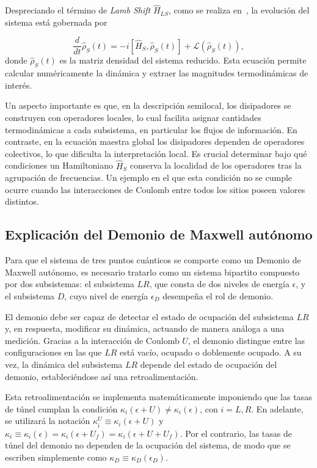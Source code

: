 Despreciando el término de \textit{Lamb Shift} $\hat{H}_{LS}$, como se realiza en~\cite{prech2023entanglement}, la evolución del sistema está gobernada por  

\begin{equation}
    \frac{d}{dt}\hat{\rho}_{S}(t) = -i[\hat{H}_{S},\hat{\rho}_{S}(t)] + \mathcal{L}(\hat{\rho}_{S}(t)),
\end{equation}
donde $\hat{\rho}_{S}(t)$ es la matriz densidad del sistema reducido. Esta ecuación permite calcular numéricamente la dinámica y extraer las magnitudes termodinámicas de interés.  

Un aspecto importante es que, en la descripción semilocal, los disipadores se construyen con operadores locales, lo cual facilita asignar cantidades termodinámicas a cada subsistema, en particular los flujos de información. En contraste, en la ecuación maestra global los disipadores dependen de operadores colectivos, lo que dificulta la interpretación local. Es crucial determinar bajo qué condiciones un Hamiltoniano $\hat{H}_S$ conserva la localidad de los operadores tras la agrupación de frecuencias. Un ejemplo en el que esta condición no se cumple ocurre cuando las interacciones de Coulomb entre todos los sitios poseen valores distintos.

\label{sec5:modelo}

\subsection{Explicación del Demonio de Maxwell autónomo}

Para que el sistema de tres puntos cuánticos se comporte como un Demonio de Maxwell autónomo, es necesario tratarlo como un sistema bipartito compuesto por dos subsistemas: el subsistema $LR$, que consta de dos niveles de energía $\epsilon$, y el subsistema $D$, cuyo nivel de energía $\epsilon_D$ desempeña el rol de demonio.

El demonio debe ser capaz de detectar el estado de ocupación del subsistema $LR$ y, en respuesta, modificar su dinámica, actuando de manera análoga a una medición. Gracias a la interacción de Coulomb $U$, el demonio distingue entre las configuraciones en las que $LR$ está vacío, ocupado o doblemente ocupado. A su vez, la dinámica del subsistema $LR$ depende del estado de ocupación del demonio, estableciéndose así una retroalimentación.

Esta retroalimentación se implementa matemáticamente imponiendo que las tasas de túnel cumplan la condición $\kappa_{i}(\epsilon + U) \neq \kappa_{i}(\epsilon)$, con $i = L, R$. En adelante, se utilizará la notación $\kappa^{U}_{i} \equiv \kappa_{i}(\epsilon+U)$ y $\kappa_{i} \equiv \kappa_{i}(\epsilon)=\kappa_{i}(\epsilon+U_{f})=\kappa_{i}(\epsilon+U+U_{f})$. Por el contrario, las tasas de túnel del demonio no dependen de la ocupación del sistema, de modo que se escriben simplemente como $\kappa_{D}\equiv \kappa_{D}(\epsilon_D)$.

